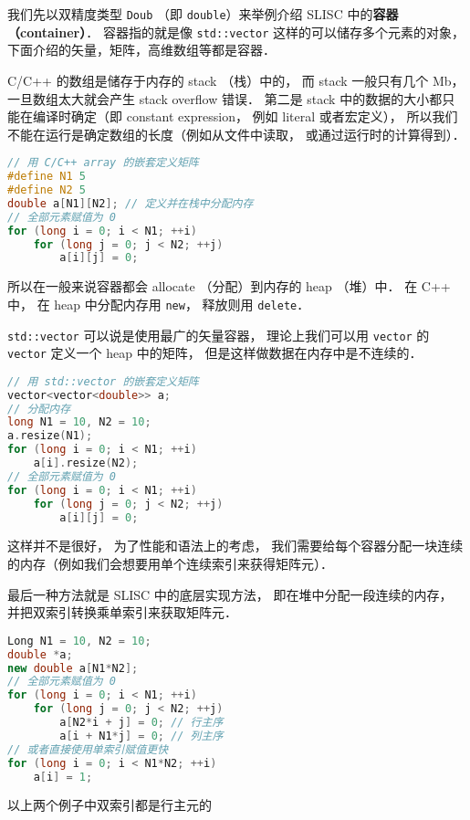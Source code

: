 
\begin{issues}
\issueDraft
\end{issues}


我们先以双精度类型 \verb|Doub| （即 \verb|double|）来举例介绍 SLISC 中的\textbf{容器（container）}． 容器指的就是像 \verb|std::vector| 这样的可以储存多个元素的对象， 下面介绍的矢量，矩阵，高维数组等都是容器．

C/C++ 的数组是储存于内存的 stack （栈）中的， 而 stack 一般只有几个 Mb， 一旦数组太大就会产生 stack overflow 错误． 第二是 stack 中的数据的大小都只能在编译时确定（即 constant expression， 例如 literal 或者宏定义）， 所以我们不能在运行是确定数组的长度（例如从文件中读取， 或通过运行时的计算得到）．
\begin{lstlisting}[language=cpp]
// 用 C/C++ array 的嵌套定义矩阵
#define N1 5
#define N2 5
double a[N1][N2]; // 定义并在栈中分配内存
// 全部元素赋值为 0
for (long i = 0; i < N1; ++i)
    for (long j = 0; j < N2; ++j)
        a[i][j] = 0;
\end{lstlisting}

所以在一般来说容器都会 allocate （分配）到内存的 heap （堆）中． 在 C++ 中， 在 heap 中分配内存用 \verb|new|， 释放则用 \verb|delete|．

\verb|std::vector| 可以说是使用最广的矢量容器， 理论上我们可以用 \verb|vector| 的 \verb|vector| 定义一个 heap 中的矩阵， 但是这样做数据在内存中是不连续的．
\begin{lstlisting}[language=cpp]
// 用 std::vector 的嵌套定义矩阵
vector<vector<double>> a;
// 分配内存
long N1 = 10, N2 = 10;
a.resize(N1);
for (long i = 0; i < N1; ++i)
    a[i].resize(N2);
// 全部元素赋值为 0
for (long i = 0; i < N1; ++i)
    for (long j = 0; j < N2; ++j)
        a[i][j] = 0;
\end{lstlisting}
这样并不是很好， 为了性能和语法上的考虑， 我们需要给每个容器分配一块连续的内存（例如我们会想要用单个连续索引来获得矩阵元）．

最后一种方法就是 SLISC 中的底层实现方法， 即在堆中分配一段连续的内存， 并把双索引转换乘单索引来获取矩阵元．
\begin{lstlisting}[language=cpp]
Long N1 = 10, N2 = 10;
double *a;
new double a[N1*N2];
// 全部元素赋值为 0
for (long i = 0; i < N1; ++i)
    for (long j = 0; j < N2; ++j)
        a[N2*i + j] = 0; // 行主序
        a[i + N1*j] = 0; // 列主序
// 或者直接使用单索引赋值更快
for (long i = 0; i < N1*N2; ++i)
    a[i] = 1;
\end{lstlisting}
以上两个例子中双索引都是行主元的

